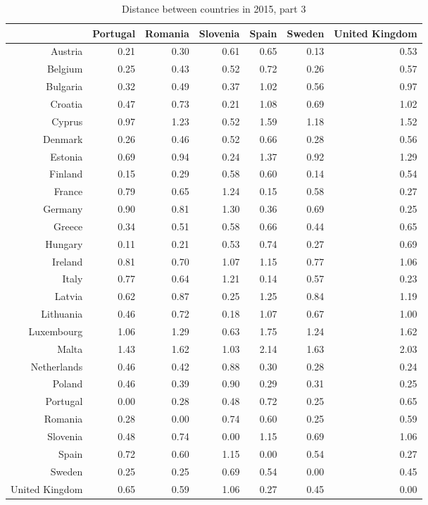 \documentclass[a4paper,twoside,10pt]{article}
\begin{document}
	\begin{table}[ht]
		\footnotesize
		\centering
		
		\begin{tabular}{r|rrrrrr}
			\hline
			& Portugal & Romania & Slovenia & Spain & Sweden & United Kingdom \\
			\hline
			Austria & 0.21 & 0.30 & 0.61 & 0.65 & 0.13 & 0.53 \\
			Belgium & 0.25 & 0.43 & 0.52 & 0.72 & 0.26 & 0.57 \\
			Bulgaria & 0.32 & 0.49 & 0.37 & 1.02 & 0.56 & 0.97 \\
			Croatia & 0.47 & 0.73 & 0.21 & 1.08 & 0.69 & 1.02 \\
			Cyprus & 0.97 & 1.23 & 0.52 & 1.59 & 1.18 & 1.52 \\
			Denmark & 0.26 & 0.46 & 0.52 & 0.66 & 0.28 & 0.56 \\
			Estonia & 0.69 & 0.94 & 0.24 & 1.37 & 0.92 & 1.29 \\
			Finland & 0.15 & 0.29 & 0.58 & 0.60 & 0.14 & 0.54 \\
			France & 0.79 & 0.65 & 1.24 & 0.15 & 0.58 & 0.27 \\
			Germany & 0.90 & 0.81 & 1.30 & 0.36 & 0.69 & 0.25 \\
			Greece & 0.34 & 0.51 & 0.58 & 0.66 & 0.44 & 0.65 \\
			Hungary & 0.11 & 0.21 & 0.53 & 0.74 & 0.27 & 0.69 \\
			Ireland & 0.81 & 0.70 & 1.07 & 1.15 & 0.77 & 1.06 \\
			Italy & 0.77 & 0.64 & 1.21 & 0.14 & 0.57 & 0.23 \\
			Latvia & 0.62 & 0.87 & 0.25 & 1.25 & 0.84 & 1.19 \\
			Lithuania & 0.46 & 0.72 & 0.18 & 1.07 & 0.67 & 1.00 \\
			Luxembourg & 1.06 & 1.29 & 0.63 & 1.75 & 1.24 & 1.62 \\
			Malta & 1.43 & 1.62 & 1.03 & 2.14 & 1.63 & 2.03 \\
			Netherlands & 0.46 & 0.42 & 0.88 & 0.30 & 0.28 & 0.24 \\
			Poland & 0.46 & 0.39 & 0.90 & 0.29 & 0.31 & 0.25 \\
			Portugal & 0.00 & 0.28 & 0.48 & 0.72 & 0.25 & 0.65 \\
			Romania & 0.28 & 0.00 & 0.74 & 0.60 & 0.25 & 0.59 \\
			Slovenia & 0.48 & 0.74 & 0.00 & 1.15 & 0.69 & 1.06 \\
			Spain & 0.72 & 0.60 & 1.15 & 0.00 & 0.54 & 0.27 \\
			Sweden & 0.25 & 0.25 & 0.69 & 0.54 & 0.00 & 0.45 \\
			United Kingdom & 0.65 & 0.59 & 1.06 & 0.27 & 0.45 & 0.00 \\
			\hline
		\end{tabular}
		\caption{Distance between countries in 2015, part 3}

	\end{table}
	
\end{document}

